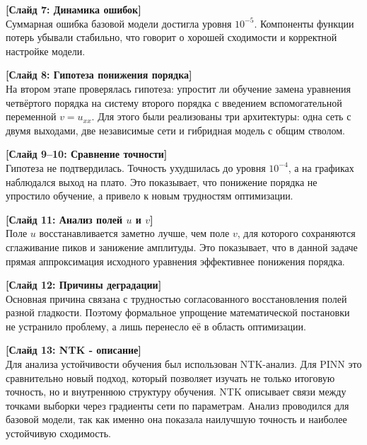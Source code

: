 \documentclass[a4paper,14pt]{extarticle}
\begin{document}
\vspace{0.8em}

\noindent \textbf{[Слайд 7: Динамика ошибок]} \\
Суммарная ошибка базовой модели достигла уровня $10^{-5}$. Компоненты функции потерь убывали стабильно, что говорит о хорошей сходимости и корректной настройке модели.

\vspace{0.8em}

\noindent \textbf{[Слайд 8: Гипотеза понижения порядка]} \\
На втором этапе проверялась гипотеза: упростит ли обучение замена уравнения четвёртого порядка на систему второго порядка с введением вспомогательной переменной $v = u_{xx}$. Для этого были реализованы три архитектуры: одна сеть с двумя выходами, две независимые сети и гибридная модель с общим стволом.

\vspace{0.8em}

\noindent \textbf{[Слайд 9--10: Сравнение точности]} \\
Гипотеза не подтвердилась. Точность ухудшилась до уровня $10^{-4}$, а на графиках наблюдался выход на плато. Это показывает, что понижение порядка не упростило обучение, а привело к новым трудностям оптимизации.

\vspace{0.8em}

\noindent \textbf{[Слайд 11: Анализ полей $u$ и $v$]} \\
Поле $u$ восстанавливается заметно лучше, чем поле $v$, для которого сохраняются сглаживание пиков и занижение амплитуды. Это показывает, что в данной задаче прямая аппроксимация исходного уравнения эффективнее понижения порядка.

\vspace{0.8em}

\noindent \textbf{[Слайд 12: Причины деградации]} \\
Основная причина связана с трудностью согласованного восстановления полей разной гладкости. Поэтому формальное упрощение математической постановки не устранило проблему, а лишь перенесло её в область оптимизации.

\vspace{0.8em}

\noindent \textbf{[Слайд 13: NTK - описание]} \\
Для анализа устойчивости обучения был использован NTK-анализ. Для PINN это сравнительно новый подход, который позволяет изучать не только итоговую точность, но и внутреннюю структуру обучения. NTK описывает связи между точками выборки через градиенты сети по параметрам. Анализ проводился для базовой модели, так как именно она показала наилучшую точность и наиболее устойчивую сходимость.
\end{document}
